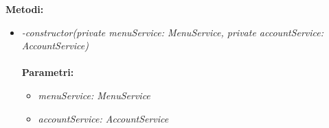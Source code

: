 	\item \textbf{Metodi:}
		\begin{itemize}
			\item \emph{-constructor(private menuService: MenuService,
    private accountService: AccountService)}\\
    		\\
    		\textbf{Parametri:}
    		\begin{itemize}
    			\item \emph{menuService: MenuService}\\
    			    			
    			\item \emph{accountService: AccountService}\\
    			
    		\end{itemize}
\end{itemize}